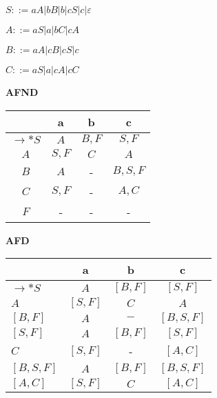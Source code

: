\documentclass[ ]{article}
\begin{document}
		$S ::= aA | bB | b | cS | c | \varepsilon$
		
		$A ::= aS | a | bC | cA$

		$B ::= aA | cB | cS | c$

		$C ::= aS | a | cA | cC$
		
\begin{center}
    \begin{minipage}[t]{0.48\textwidth} %
        \centering %
        \textbf{AFND}\\ %
        \vspace{0.2cm} %
        \begin{tabular}{|c|c|c|c|} %
            \toprule %
            & a & b & c\\
            \midrule %
		$\to *S$ & $A$ & $B,F$ & $S,F$\\
		$A$ & $S,F$& $C$ & $A$\\
		$B$ & $A$ & - & $B,S,F$\\
		$C$ & $S,F$ & - &$A,C$\\
		$F$ & - & - & -\\
            \bottomrule %
        \end{tabular}
    \end{minipage}%
    \hfill %
    \begin{minipage}[t]{0.48\textwidth} %
        \centering %
        \textbf{AFD}\\ %
        \vspace{0.2cm} %
        \begin{tabular}{|l|c|c|c|} %
            \toprule %
            & a & b & c\\
            \midrule %
		$\to *S$ & $A$ & $[B,F]$ & $[S,F]$\\
		$A$ & $[S,F]$ & $C$ & $ A$\\
		$[B,F]$ & $A$ & $-$ & $[B,S,F]$\\
		$[S,F]$ &  $A$ & $[B,F]$ & $[S,F]$\\
		$C$ & $[S,F]$ & - & $[A,C]$\\
		$[B,S,F]$ & $A$ & $[B,F]$ & $[B,S,F]$\\
		$[A,C]$ & $[S,F]$ & $C$ & $[A,C]$\\
            \bottomrule %
        \end{tabular}
    \end{minipage}
\end{center}
\end{document}
